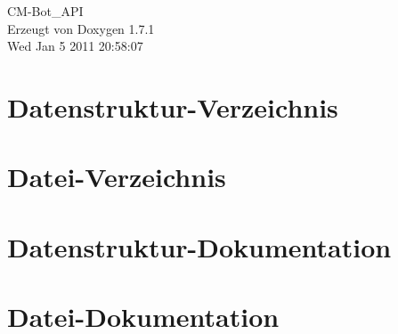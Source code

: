 \documentclass[a4paper]{report}
\begin{document}
\begin{titlepage}
\vspace*{7cm}
\begin{center}
{\Large CM-\/Bot\_\-API }\\
\vspace*{1cm}
{\large Erzeugt von Doxygen 1.7.1}\\
\vspace*{0.5cm}
{\small Wed Jan 5 2011 20:58:07}\\
\end{center}
\end{titlepage}
\clearemptydoublepage
{}
\tableofcontents
\clearemptydoublepage
{}
\chapter{Datenstruktur-\/Verzeichnis}

\chapter{Datei-\/Verzeichnis}

\chapter{Datenstruktur-\/Dokumentation}










\chapter{Datei-\/Dokumentation}








































\printindex
\end{document}
